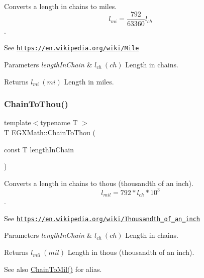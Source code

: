 Converts a length in chains to miles. \[ l_{mi}=\frac{792}{63360} l_{ch} \]. 

See \href{https://en.wikipedia.org/wiki/Mile}{\tt https\+://en.\+wikipedia.\+org/wiki/\+Mile} 
\begin{DoxyParams}{Parameters}
{\em length\+In\+Chain} & $ l_{ch}\ (ch)$ Length in chains. \\
\hline
\end{DoxyParams}
\begin{DoxyReturn}{Returns}
$ l_{mi}\ (mi)$ Length in miles. 
\end{DoxyReturn}
\mbox{\label{group___e_g_x_math-_conversions-_length_conversions-_surveyors-_chain-_imperial_ga64cd46f80e3af5d7ca664456080ef6a3}} 
\subsubsection{\texorpdfstring{Chain\+To\+Thou()}{ChainToThou()}}
{\footnotesize\ttfamily template$<$typename T $>$ \\
T E\+G\+X\+Math\+::\+Chain\+To\+Thou (\begin{DoxyParamCaption}\item[{const T}]{length\+In\+Chain }\end{DoxyParamCaption})}



Converts a length in chains to thous (thousandth of an inch). \[ l_{mil}= 792 * l_{ch} * 10^{3} \]. 

See \href{https://en.wikipedia.org/wiki/Thousandth_of_an_inch}{\tt https\+://en.\+wikipedia.\+org/wiki/\+Thousandth\+\_\+of\+\_\+an\+\_\+inch} 
\begin{DoxyParams}{Parameters}
{\em length\+In\+Chain} & $ l_{ch}\ (ch)$ Length in chains. \\
\hline
\end{DoxyParams}
\begin{DoxyReturn}{Returns}
$ l_{mil}\ (mil)$ Length in thous (thousandth of an inch). 
\end{DoxyReturn}
\begin{DoxySeeAlso}{See also}
\mbox{\hyperlink{group___e_g_x_math-_conversions-_length_conversions-_surveyors-_chain-_imperial_gae1276611dce26e23deae1b0379b4394d}{Chain\+To\+Mil()}} for alias. 
\end{DoxySeeAlso}
\mbox{\label{group___e_g_x_math-_conversions-_length_conversions-_surveyors-_chain-_imperial_ga9d6b8e5d2dfaf555b923e8ba2d324ae4}} 
